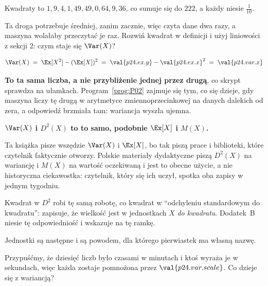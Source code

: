 \begin{fr}

Kwadraty to $1, 9, 4, 1, 49, 49, 0, 64, 9, 36$, co sumuje się do $222$, a
każdy niesie $\frac{1}{10}$.

Ta droga potrzebuje średniej, zanim zacznie, więc czyta dane dwa razy, a
maszyna wolałaby przeczytać je raz. Rozwiń kwadrat w definicji i użyj
liniowości z sekcji 2: czym staje się $\Var(X)$?
\dotline
\nextframe
\end{fr}

\begin{fr}
\begin{ansblock}
\[ \Var(X) \;=\; \Ex[X^{2}] - (\Ex[X])^{2}
   \;=\; \val{p24.ex.y} - \val{p24.ex.x}^{2}
   \;=\; \val{p24.var.x} \]
\end{ansblock}

\textbf{To ta sama liczba, a nie przybliżenie jednej przez drugą}, co skrypt
sprawdza na ułamkach. Program~\ref{prog:P02} zajmuje się tym, co się dzieje,
gdy maszyna liczy tę drugą w arytmetyce zmiennoprzecinkowej na danych dalekich
od zera, a odpowiedź brzmiała tam: wariancja wyszła ujemna.
\end{fr}

\begin{fr}
\begin{notationbox}
\textbf{$\Var(X)$ i $D^{2}(X)$ to to samo, podobnie $\Ex[X]$ i $M(X)$.}

Ta książka pisze wszędzie $\Var(X)$ i $\Ex[X]$, bo tak piszą prace i
biblioteki, które czytelnik faktycznie otworzy. Polskie materiały dydaktyczne
piszą $D^{2}(X)$ na wariancję i $M(X)$ na wartość oczekiwaną i jest to obecne
użycie, a nie historyczna ciekawostka: czytelnik, który się ich uczył, spotka
oba zapisy w jednym tygodniu.

Kwadrat w $D^{2}$ robi tę samą robotę, co kwadrat w
\enquote{odchyleniu standardowym do kwadratu}: zapisuje, że wielkość jest w
jednostkach $X$ \emph{do kwadratu}. Dodatek~B niesie tę odpowiedniość i
wskazuje na tę ramkę.
\end{notationbox}
\end{fr}

\begin{fr}
Jednostki są następne i są powodem, dla którego pierwiastek ma własną nazwę.

Przypuśćmy, że dziesięć liczb było czasami w minutach i ktoś wyraża je w
sekundach, więc każda zostaje pomnożona przez $\val{p24.var.scale}$. Co dzieje
się z wariancją?
\dotline
\nextframe
\end{fr}

